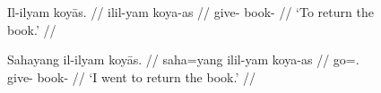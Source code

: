 \begin{figure}
\pex\label{ex:vpsent}
\a\label{ex:vpsent_1}\ljudge*\begingl
	\gla Il-ilyam koyās. //
	\glb il\til{}il-yam koya-as //
	\glc \Iter{}\til{}give-\Ptcp{} book-\Parg{} //
	\glft `To return the book.' //
\endgl

\a\label{ex:vpsent_2}\begingl
	\gla Sahayang il-ilyam koyās. //
	\glb saha=yang il\til{}il-yam koya-as //
	\glc go=\Fsg{}.\Aarg{} \Iter{}\til{}give-\Ptcp{} book-\Parg{} //
	\glft `I went to return the book.' //
\endgl
\xe
\end{figure}

\begin{figure}
\begin{morphlex}
\ex\label{ex:verbmorphlex}%
\xe
\end{morphlex}
\end{figure}

